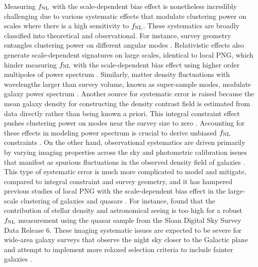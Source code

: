 Measuring $f_{\rm NL}$ with the scale-dependent bias effect is nonetheless incredibly challenging due to various systematic effects that modulate clustering power on scales where there is a high sensitivity to $f_{\rm NL}$. These systematics are broadly classified into theoretical and observational. For instance, survey geometry entangles clustering power on different angular modes \citep{beutler2014clustering,wilson2017rapid}. Relativistic effects also generate scale-dependent signatures on large scales, identical to local PNG, which hinder measuring $f_{\rm NL}$ with the scale-dependent bias effect using higher order multipoles of power spectrum \citep{wang2020}. Similarly, matter density fluctuations with wavelengths larger than survey volume, known as super-sample modes, modulate galaxy power spectrum \citep{castorina2020JCAP}. Another source for systematic error is raised because the mean galaxy density for constructing the density contrast field is estimated from data directly rather than being known a priori. This integral constraint effect pushes clustering power on modes near the survey size to zero \citep{peacock1991large,de2019integral}. Accounting for these effects in modeling power spectrum is crucial to derive unbiased $f_{\rm NL}$ constraints \citep[see, e.g.,][]{riquelme2022primordial}. On the other hand, observational systematics are driven primarily by varying imaging properties across the sky \citep{ross2011} and photometric calibration issues that manifest as spurious fluctuations in the observed density field of galaxies \citep{huterer2013calibration}. This type of systematic error is much more complicated to model and mitigate, compared to integral constraint and survey geometry, and it has hampered previous studies of local PNG with the scale-dependent bias effect in the large-scale clustering of galaxies and quasars \citep[see, e.g.,][]{Ho2015JCAP...05..040H}. For instance, \cite{pullen2013systematic} found that the contribution of stellar density and astronomical seeing is too high for a robust $f_{\rm NL}$ measurement using the quasar sample from the Sloan Digital Sky Survey Data Release 6. These imaging systematic issues are expected to be severe for wide-area galaxy surveys that observe the night sky closer to the Galactic plane and attempt to implement more relaxed selection criteria to include fainter galaxies \citep[see, e.g,][]{kitanidis2020imaging}. 
 
